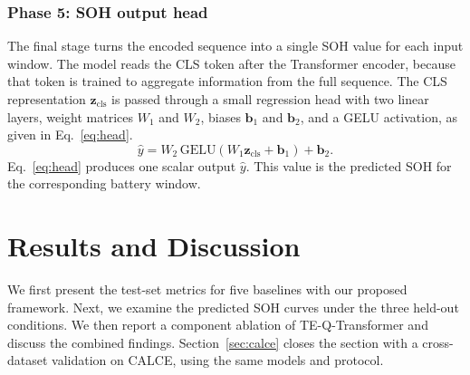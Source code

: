 \documentclass[a4paper,fleqn]{cas-sc}
\begin{document}
\subsubsection{Phase 5: SOH output head}
The final stage turns the encoded sequence into a single SOH value for each input window. The model reads the CLS token after the Transformer encoder, because that token is trained to aggregate information from the full sequence. The CLS representation $\mathbf{z}_{\mathrm{cls}}$ is passed through a small regression head with two linear layers, weight matrices $W_{1}$ and $W_{2}$, biases $\mathbf{b}_{1}$ and $\mathbf{b}_{2}$, and a GELU activation, as given in Eq.~\eqref{eq:head}.
\begin{equation}
\hat{y}
=
W_{2}\,\mathrm{GELU}(W_{1}\mathbf{z}_{\mathrm{cls}}+\mathbf{b}_{1})+\mathbf{b}_{2}.
\label{eq:head}
\end{equation}
Eq.~\eqref{eq:head} produces one scalar output $\hat{y}$. This value is the predicted SOH for the corresponding battery window.




\section{Results and Discussion}
\label{sec:results}
We first present the test-set metrics for five baselines with our proposed framework. Next, we examine the predicted SOH curves under the three held-out conditions. We then report a component ablation of TE-Q-Transformer and discuss the combined findings. Section~\ref{sec:calce} closes the section with a cross-dataset validation on CALCE, using the same models and protocol.
\end{document}
